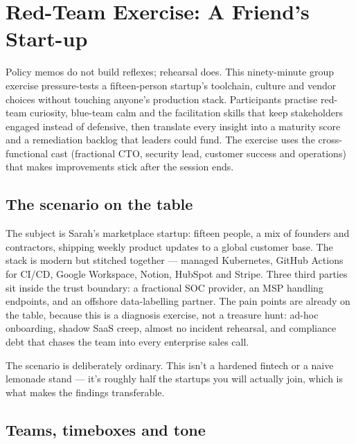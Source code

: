 \section{Red-Team Exercise: A Friend's Start-up}
Policy memos do not build reflexes; rehearsal does. This ninety-minute group exercise pressure-tests a fifteen-person startup's toolchain, culture and vendor choices without touching anyone's production stack. Participants practise red-team curiosity, blue-team calm and the facilitation skills that keep stakeholders engaged instead of defensive, then translate every insight into a maturity score and a remediation backlog that leaders could fund. The exercise uses the cross-functional cast (fractional CTO, security lead, customer success and operations) that makes improvements stick after the session ends.



\subsection{The scenario on the table}


The subject is Sarah's marketplace startup: fifteen people, a mix of founders and contractors, shipping weekly product updates to a global customer base. The stack is modern but stitched together — managed Kubernetes, GitHub Actions for CI/CD, Google Workspace, Notion, HubSpot and Stripe. Three third parties sit inside the trust boundary: a fractional SOC provider, an MSP handling endpoints, and an offshore data-labelling partner. The pain points are already on the table, because this is a diagnosis exercise, not a treasure hunt: ad-hoc onboarding, shadow SaaS creep, almost no incident rehearsal, and compliance debt that chases the team into every enterprise sales call.


The scenario is deliberately ordinary. This isn't a hardened fintech or a naive lemonade stand — it's roughly half the startups you will actually join, which is what makes the findings transferable.



\subsection{Teams, timeboxes and tone}


